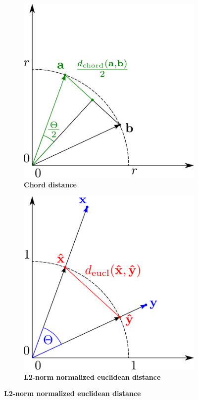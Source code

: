 \begin{figure}[!hbt]
    \centering
    \begin{subfigure}[b]{0.475\textwidth}
        \caption[Chord]{\textbf{Chord distance}}
        \label{subfig:Chord}
        \includegraphics[width=\textwidth]{Graphics/Chord.pdf}
    \end{subfigure}
    \hfill
    \begin{subfigure}[b]{0.475\textwidth}
        \caption[L2]{\textbf{L2-norm normalized euclidean distance}}
        \label{subfig:L2}            
        \includegraphics[width=\textwidth]{Graphics/L2.pdf}

\end{subfigure}
\end{figure}
